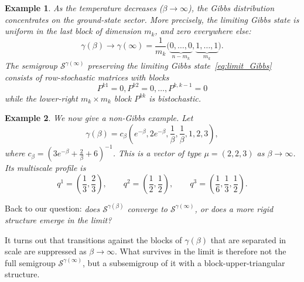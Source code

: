 \documentclass[11pt,a4paper,longbibliography]{amsart}
\numberwithin{equation}{section}
\theoremstyle{plain}
\newtheorem{ex}{Example}[section]
\theoremstyle{definition}
\theoremstyle{remark}
\begin{document}
\begin{ex}
		
		As the temperature decreases ($\beta\to\infty$), the Gibbs distribution concentrates on the ground-state sector. More precisely, the limiting Gibbs state is uniform in the last block of dimension $m_k$, and zero everywhere else:
		\begin{equation}
			\label{eq:limit_Gibbs}
			\gamma(\beta)
			\to
			\gamma(\infty)
			=
			\frac1{m_k}\big(
			\underbrace{0,\ldots,0}_{n-m_k},
			\underbrace{1,\ldots,1}_{m_k}
			\big).
		\end{equation}
		The semigroup $\mathcal{S}^{\gamma(\infty)}$ preserving the limiting Gibbs state~\eqref{eq:limit_Gibbs}
		consists of row-stochastic matrices with blocks
		\begin{equation}
			P^{k1}=0, P^{k2}=0,\ldots,  P^{k,{k-1}}=0  
		\end{equation}
		while the lower-right $m_k\times m_k$ block $P^{kk}$ is bistochastic.
	\end{ex}
	\begin{ex} We now give a non-Gibbs example. 
		Let $$\gamma(\beta)=c_{\beta}\left(e^{-\beta}, 2e^{-\beta},\frac{1}{\beta},\frac{1}{\beta},1,2,3\right),$$ where $c_{\beta}=(3e^{-\beta}+\frac{2}{\beta}+6)^{-1}$. This is a vector of type $\mu=(2,2,3)$ as $\beta\to\infty$. Its multiscale profile is 
		$$ 
		q^1=\left(\frac{1}{3},\frac{2}{3}\right),\qquad
		q^2=\left(\frac{1}{2},\frac{1}{2}\right),\qquad
		q^3=\left(\frac{1}{6},\frac{1}{3},\frac{1}{2}\right).
		$$
	\end{ex}
	
	Back to our question: \emph{does $\mathcal{S}^{\gamma(\beta)}$ converge to $\mathcal{S}^{\gamma(\infty)}$, or does a more rigid structure emerge in the limit?}
	
	It turns out that transitions against the blocks of $\gamma(\beta)$ that are separated in scale are suppressed as $\beta\to\infty$. What survives in the limit is therefore not the full  semigroup $\mathcal{S}^{\gamma(\infty)}$, but a subsemigroup of it with a block-upper-triangular structure.
	
\end{document}

